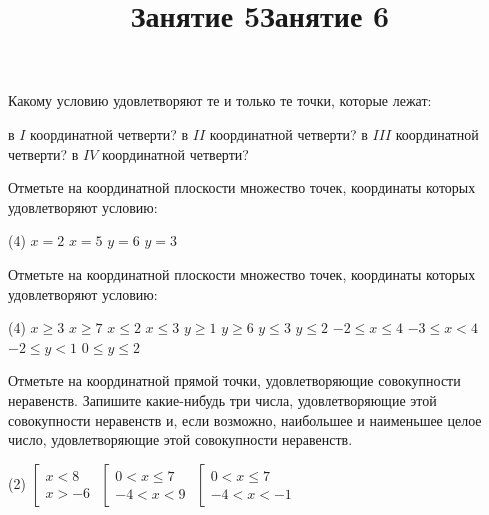 \begin{class}[number=5-6]
	\title{Занятие 5}
	\begin{listofex}
		\item Какому условию удовлетворяют те и только те точки, которые лежат:
		\begin{tasks}
			\task в \( I \) координатной четверти?
			\task в \( II \) координатной четверти?
			\task в \( III \) координатной четверти?
			\task в \( IV \) координатной четверти?
		\end{tasks}
		\item Отметьте на координатной плоскости множество точек, координаты которых удовлетворяют условию:
		\begin{tasks}(4)
			\task \( x=2 \)
			\task \( x=5 \)
			\task \( y=6 \)
			\task \( y=3 \)
		\end{tasks}
		\item Отметьте на координатной плоскости множество точек, координаты которых удовлетворяют условию:
		\begin{tasks}(4)
			\task \( x \ge 3 \)
			\task \( x \ge 7 \)
			\task \( x \le 2 \)
			\task \( x \le 3 \)
			\task \( y \ge 1 \)
			\task \( y \ge 6 \)
			\task \( y \le 3 \)
			\task \( y \le 2 \)
			\task \( -2 \le x \le 4 \)
			\task \( -3 \le x < 4 \)
			\task \( -2 \le y < 1 \)
			\task \( 0 \le y \le 2 \)
		\end{tasks}
		\item Отметьте на координатной прямой точки, удовлетворяющие совокупности неравенств. Запишите какие-нибудь три числа, удовлетворяющие этой совокупности неравенств и, если возможно, наибольшее и наименьшее целое число, удовлетворяющие этой совокупности неравенств.
		\begin{tasks}(2)
			\task \( \left[ 
			\begin{array}{l}
				x<8\\
				x>-6
			\end{array}
			\right. \)
			\task \( \left[
			\begin{array}{l} 0<x \le 7 \\ -4 < x < 9 \end{array} \right. \)
			\task \( \left[
			\begin{array}{l} 0<x \le 7 \\ -4<x<-1 \end{array} \right. \)
		\end{tasks}
	\end{listofex}
	\title{Занятие 6}

\end{class}
